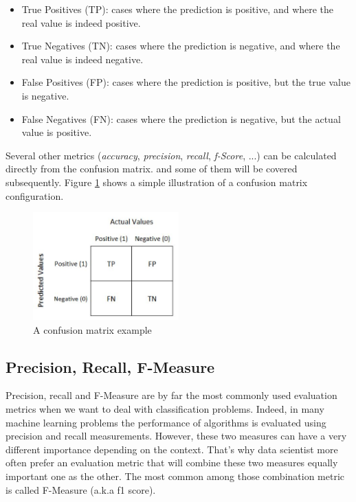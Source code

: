 \documentclass[LaM,binding=0.6cm, english]{sapthesis}
\begin{document}
\begin{itemize}
	\item True Positives (TP): cases where the prediction is positive, and where the real value is indeed positive.
  	\item True Negatives (TN): cases where the prediction is negative, and where the real value is indeed negative.
  	\item False Positives (FP): cases where the prediction is positive, but the true value is negative.
  	\item False Negatives (FN): cases where the prediction is negative, but the actual value is positive.
\end{itemize}

\par Several other metrics (\textit{accuracy}, \textit{precision}, \textit{recall}, \textit{f-Score}, ...) can be calculated directly from the confusion matrix. and some of them will be covered subsequently. Figure \ref{fig:confusion-matrix} shows a simple illustration of a confusion matrix configuration.

\begin{figure}[!ht]
    \includegraphics[width=0.5\textwidth]{images/confusion-matrix-exemple.jpg}
    \centering
    \caption{A confusion matrix example}
    \label{fig:confusion-matrix}
\end{figure}

\subsection{Precision, Recall, F-Measure}

Precision, recall and F-Measure are by far the most commonly used evaluation metrics when we want to deal with classification problems. Indeed, in many machine learning problems the performance of algorithms is evaluated using precision and recall measurements.\cite{Sokolova2006} However, these two measures can have a very different importance depending on the
context. That's why data scientist more often prefer an evaluation metric that will combine these two measures equally important one as the other. The most common among those combination metric is called F-Measure (a.k.a f1 score).\cite{Albatineh2011}
\end{document}
